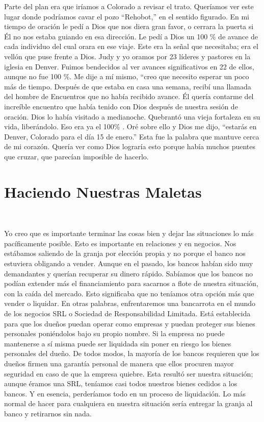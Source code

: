 \documentclass[twoside, 12pt]{book}
\begin{document}
Parte del plan era que iríamos a Colorado a revisar el trato. Queríamos ver este lugar donde podríamos cavar el pozo “Rehobot,” en el sentido figurado. En mi tiempo de oración le pedí a Dios que nos diera gran favor, o cerrara la puerta si Él no nos estaba guiando en esa dirección. Le pedí a Dios un 100 \% de avance de cada individuo del cual orara en ese viaje. Este era la señal que necesitaba; era el vellón que puse frente a Dios. Judy y yo oramos por 23 líderes y pastores en la iglesia en Denver. Fuimos bendecidos al ver avances significativos en 22 de ellos, aunque no fue 100 \%. Me dije a mí mismo, “creo que necesito esperar un poco más de tiempo. Después de que estaba en casa una semana, recibí una llamada del hombre de Encuentros que no había recibido avance. Él quería contarme del increíble encuentro que había tenido con Dios después de nuestra sesión de oración. Dios lo había visitado a medianoche. Quebrantó una vieja fortaleza en su vida, liberándolo. Eso era ya el 100\% . Oré sobre ello y Dios me dijo, “estarás en Denver, Colorado para el día 15 de enero.” Esta fue la palabra que mantuve cerca de mi corazón. Quería ver como Dios lograría esto porque había muchos puentes que cruzar, que parecían imposible de hacerlo.\\




\chapter{Haciendo Nuestras Maletas}
\

Yo creo que es importante terminar las cosas bien y dejar las situaciones lo más pacíficamente posible. Esto es importante en relaciones y en negocios. Nos estábamos saliendo de la granja por elección propia y no porque el banco nos estuviera obligando a vender. Aunque en el pasado, los bancos habían sido muy demandantes y querían recuperar su dinero rápido. Sabíamos que los bancos no podían extender más el financiamiento para sacarnos a flote de nuestra situación, con la caída del mercado. Esto significaba que no teníamos otra opción más que vender o liquidar. En otras palabras, enfrentaremos una bancarrota en el mundo de los negocios SRL o Sociedad de Responsabilidad Limitada. Está establecida para que los dueños puedan operar como empresas y puedan proteger sus bienes personales poniéndolos bajo su propio nombre. Si la empresa no puede mantenerse a sí misma puede ser liquidada sin poner en riesgo los bienes personales del dueño. De todos modos, la mayoría de los bancos requieren que los dueños firmen una garantía personal de manera que ellos procuren mayor seguridad en caso de que la empresa quiebre. Esta resultó ser nuestra situación; aunque éramos una SRL, teníamos casi todos nuestros bienes cedidos a los bancos. Y en esencia, perderíamos todo en un proceso de liquidación. Lo más normal de hacer para cualquiera en nuestra situación sería entregar la granja al banco y retirarnos sin nada.\\
\end{document}
